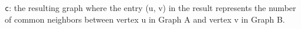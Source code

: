 {\small
      
}
\begin{itemdescr}
      \pnum\effects \lstinline{c}: the resulting graph where the entry (u, v) in the result represents the number of common neighbors between vertex u in Graph A and vertex v in Graph B.
\end{itemdescr}

